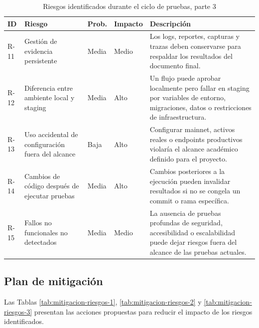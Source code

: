 \documentclass[12pt,letterpaper]{article}
\begin{document}
\begin{table}[H]
\centering
\begingroup
\scriptsize
\setlength{\tabcolsep}{2.5pt}
\renewcommand{\arraystretch}{1.18}

\begin{tabularx}{\textwidth}{|
>{\centering\arraybackslash}p{1.1cm}|
>{\raggedright\arraybackslash}p{3.4cm}|
>{\centering\arraybackslash}p{1.8cm}|
>{\centering\arraybackslash}p{1.6cm}|
>{\raggedright\arraybackslash}X|}
\hline
\textbf{ID} & \textbf{Riesgo} & \textbf{Prob.} & \textbf{Impacto} & \textbf{Descripción} \\
\hline
R-11 & Gestión de evidencia persistente & Media & Medio & Los logs, reportes, capturas y trazas deben conservarse para respaldar los resultados del documento final. \\
\hline
R-12 & Diferencia entre ambiente local y staging & Media & Alto & Un flujo puede aprobar localmente pero fallar en staging por variables de entorno, migraciones, datos o restricciones de infraestructura. \\
\hline
R-13 & Uso accidental de configuración fuera del alcance & Baja & Alto & Configurar mainnet, activos reales o endpoints productivos violaría el alcance académico definido para el proyecto. \\
\hline
R-14 & Cambios de código después de ejecutar pruebas & Media & Alto & Cambios posteriores a la ejecución pueden invalidar resultados si no se congela un commit o rama específica. \\
\hline
R-15 & Fallos no funcionales no detectados & Media & Medio & La ausencia de pruebas profundas de seguridad, accesibilidad o escalabilidad puede dejar riesgos fuera del alcance de las pruebas actuales. \\
\hline
\end{tabularx}

\endgroup
\caption{Riesgos identificados durante el ciclo de pruebas, parte 3}
\label{tab:riesgos-identificados-3}
\end{table}

\subsection{Plan de mitigación}

Las Tablas \ref{tab:mitigacion-riesgos-1}, \ref{tab:mitigacion-riesgos-2} y \ref{tab:mitigacion-riesgos-3} presentan las acciones propuestas para reducir el impacto de los riesgos identificados.
\end{document}
